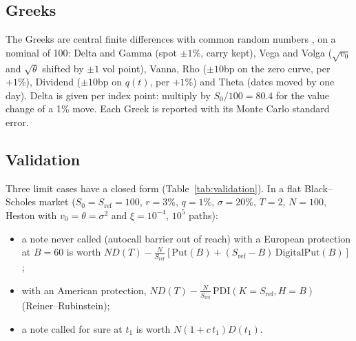 \documentclass[11pt,a4paper]{article}
\newcommand{\Sref}{S_{\mathrm{ref}}}
\begin{document}
\subsection{Greeks}
The Greeks are central finite differences with common random numbers \cite{glasserman2004}, on a nominal of 100:
Delta and Gamma (spot $\pm 1\%$, carry kept), Vega and Volga ($\sqrt{v_0}$ and $\sqrt{\theta}$ shifted by
$\pm 1$ vol point), Vanna, Rho ($\pm 10$bp on the zero curve, per $+1\%$), Dividend ($\pm 10$bp on $q(t)$, per
$+1\%$) and Theta (dates moved by one day). Delta is given per index point: multiply by $S_0/100 = 80.4$ for the
value change of a 1\% move. Each Greek is reported with its Monte Carlo standard error.

\subsection{Validation}
Three limit cases have a closed form (Table~\ref{tab:validation}). In a flat Black--Scholes
market ($S_0 = \Sref = 100$, $r = 3\%$, $q = 1\%$, $\sigma = 20\%$, $T = 2$, $N = 100$, Heston with $v_0 = \theta = \sigma^2$
and $\xi = 10^{-4}$, $10^5$ paths):
\begin{itemize}
\item a note never called (autocall barrier out of reach) with a European protection at $B = 60$ is worth
$N D(T) - \frac{N}{\Sref}\left[\mathrm{Put}(B) + (\Sref - B)\,\mathrm{DigitalPut}(B)\right]$;
\item with an American protection, $N D(T) - \frac{N}{\Sref}\,\mathrm{PDI}(K = \Sref, H = B)$ (Reiner--Rubinstein);
\item a note called for sure at $t_1$ is worth $N(1 + c\, t_1) D(t_1)$.
\end{itemize}

\begin{table}[h]
\centering
{}
\caption{Validation of the pricer.}
\label{tab:validation}
\end{table}
\end{document}
